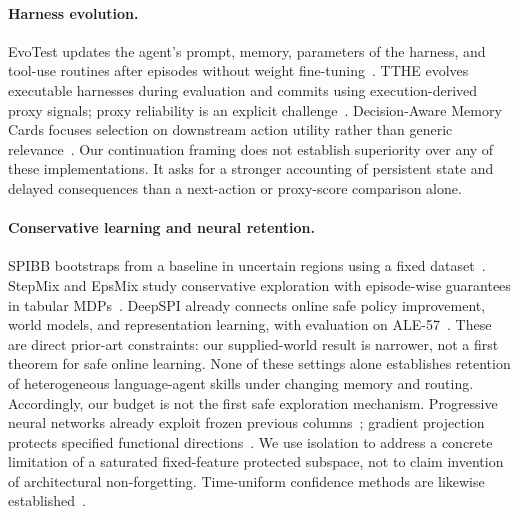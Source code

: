 \documentclass[10pt,twocolumn]{article}
\begin{document}
\paragraph{Harness evolution.}
EvoTest updates the agent's prompt, memory, parameters of the harness, and tool-use
routines after episodes without weight fine-tuning~\cite{evotest}. TTHE evolves
executable harnesses during evaluation and commits using execution-derived proxy
signals; proxy reliability is an explicit challenge~\cite{tthe}. Decision-Aware
Memory Cards focuses selection on downstream action utility rather than generic
relevance~\cite{cards}. Our continuation framing does not establish superiority
over any of these implementations. It asks for a stronger accounting of persistent
state and delayed consequences than a next-action or proxy-score comparison alone.

\paragraph{Conservative learning and neural retention.}
SPIBB bootstraps from a baseline in uncertain regions using a fixed dataset~\cite{spibb}.
StepMix and EpsMix study conservative exploration with episode-wise guarantees
in tabular MDPs~\cite{stepmix}. DeepSPI already connects online safe policy
improvement, world models, and representation learning, with evaluation on
ALE-57~\cite{deepspi}. These are direct prior-art constraints: our supplied-world
result is narrower, not a first theorem for safe online learning. None of these
settings alone establishes retention of heterogeneous language-agent skills under
changing memory and routing. Accordingly, our budget is not the first safe
exploration mechanism. Progressive neural networks already exploit frozen
previous columns~\cite{progressive}; gradient projection protects specified
functional directions~\cite{ogd}. We use isolation to address a concrete limitation
of a saturated fixed-feature protected subspace, not to claim invention of
architectural non-forgetting. Time-uniform confidence methods are likewise
established~\cite{confidence}.
\end{document}
